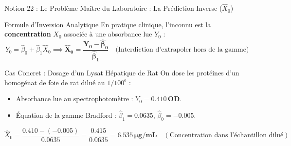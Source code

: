 \documentclass[aspectratio=169,10pt]{beamer}
\begin{document}
\begin{frame}{Notion 22 : Le Problème Maître du Laboratoire : La Prédiction Inverse ($\hat{X}_0$)}
  \begin{conceptbox}{Formule d'Inversion Analytique}
    \footnotesize
    En pratique clinique, l'inconnu est la \textbf{concentration} $X_0$ associée à une absorbance lue $Y_0$ :
    \begin{equation*}
      Y_0 = \hat{\beta}_0 + \hat{\beta}_1 \hat{X}_0 \implies \mathbf{\hat{X}_0 = \frac{Y_0 - \hat{\beta}_0}{\hat{\beta}_1}} \quad \text{(Interdiction d'extrapoler hors de la gamme)}
    \end{equation*}
  \end{conceptbox}
  \vspace{1mm}
  \begin{biobox}{Cas Concret : Dosage d'un Lysat Hépatique de Rat}
    \footnotesize
    On dose les protéines d'un homogénat de foie de rat dilué au $1/100^{\text{e}}$ :
    \begin{itemize}
      \item Absorbance lue au spectrophotomètre : $Y_0 = \mathbf{0.410\,\text{OD}}$.
      \item Équation de la gamme Bradford : $\hat{\beta}_1 = 0.0635$, $\hat{\beta}_0 = -0.005$.
    \end{itemize}
    \begin{equation*}
      \hat{X}_0 = \frac{0.410 - (-0.005)}{0.0635} = \frac{0.415}{0.0635} = \mathbf{6.535\,\mu\text{g/mL}} \quad (\text{Concentration dans l'échantillon dilué})
    \end{equation*}
  \end{biobox}
\end{frame}
\end{document}
